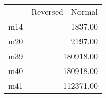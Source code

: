 \begin{tabular}{lr}
 & Reversed - Normal \\
m14 & 1837.00 \\
m20 & 2197.00 \\
m39 & 180918.00 \\
m40 & 180918.00 \\
m41 & 112371.00 \\
\end{tabular}
